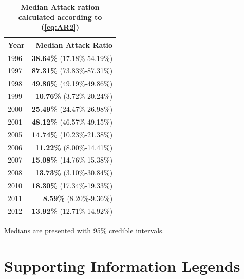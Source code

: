 \begin{table}[!ht]
\caption{
\bf{Median Attack ration calculated according to (\ref{eq:AR2})}}
\begin{center}
\begin{tabular}{l|r}
\hline
Year & Median Attack Ratio \\
\hline
1996 & \textbf{38.64\%} (17.18\%-54.19\%)\\
1997 & \textbf{87.31\%} (73.83\%-87.31\%)\\
1998 & \textbf{49.86\%} (49.19\%-49.86\%)\\
1999 & \textbf{10.76\%} (3.72\%-20.24\%)\\
2000 & \textbf{25.49\%} (24.47\%-26.98\%)\\
2001 & \textbf{48.12\%} (46.57\%-49.15\%)\\
2005 & \textbf{14.74\%} (10.23\%-21.38\%)\\
2006 & \textbf{11.22\%} (8.00\%-14.41\%)\\
2007 & \textbf{15.08\%} (14.76\%-15.38\%)\\
2008 & \textbf{13.73\%} (3.10\%-30.84\%)\\
2010 & \textbf{18.30\%} (17.34\%-19.33\%)\\
2011 & \textbf{8.59\%} (8.20\%-9.36\%)\\
2012 & \textbf{13.92\%} (12.71\%-14.92\%)\\
\hline
\end{tabular}
\begin{flushleft}Medians are presented with 95\% credible intervals.
\end{flushleft}

\end{center}



\label{tab:AR}
\end{table}

\section*{Supporting Information Legends}
%
% 



